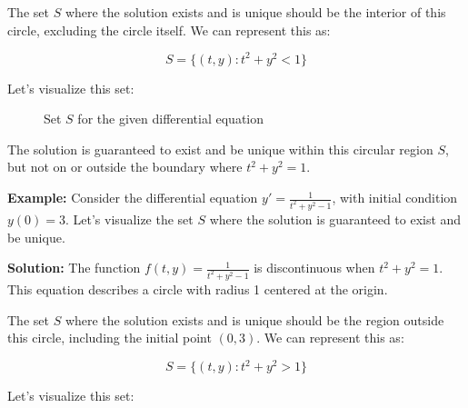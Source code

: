 \documentclass{article}
\begin{document}
The set $S$ where the solution exists and is unique should be the interior of this circle, excluding the circle itself. We can represent this as:

\[S = \{(t,y) : t^2 + y^2 < 1\}\]

Let's visualize this set:

\begin{figure}[h]
    \centering
    \caption{Set $S$ for the given differential equation}
    \label{fig:set_S_circle_example}
\end{figure}

The solution is guaranteed to exist and be unique within this circular region $S$, but not on or outside the boundary where $t^2 + y^2 = 1$.

\textbf{Example:} Consider the differential equation $y' = \frac{1}{t^2 + y^2 - 1}$, with initial condition $y(0) = 3$. Let's visualize the set $S$ where the solution is guaranteed to exist and be unique.

\textbf{Solution:} 
The function $f(t,y) = \frac{1}{t^2 + y^2 - 1}$ is discontinuous when $t^2 + y^2 = 1$. This equation describes a circle with radius 1 centered at the origin.

The set $S$ where the solution exists and is unique should be the region outside this circle, including the initial point $(0,3)$. We can represent this as:

\[S = \{(t,y) : t^2 + y^2 > 1\}\]

Let's visualize this set:
\end{document}
